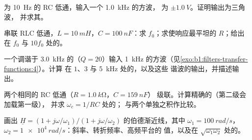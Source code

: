 \begin{exercise}[$\star\star$]\label{exo:b1:filters-transfer-functions:6}
为 \qty{10}{Hz} 的 RC 低通，输入一个 \qty{1.0}{kHz} 的方波，
为 $\pm\qty{1.0}{V}$。证明输出为三角波，
并求其。
\end{exercise}

\begin{exercise}[$\star\star$]\label{exo:b1:filters-transfer-functions:7}
串联 RLC 低通，$L = \qty{10}{mH}$，$C = \qty{100}{nF}$：求
$f_0$；求使响应最平坦的 $R$；给出
在 $f_0$ 与 $10f_0$ 处的。
\end{exercise}

\begin{exercise}[$\star\star$]\label{exo:b1:filters-transfer-functions:8}
一个调谐于 \qty{3.0}{kHz} 的（$Q = 20$）输入
\qty{1}{kHz} 的方波（见\cref{exo:b1:filters-transfer-functions:4}）。计算
在 $1$、$3$ 与 \qty{5}{kHz} 处的，以及这些
谐波的输出，并描述输出。
\end{exercise}

\begin{exercise}[$\star\star$]\label{exo:b1:filters-transfer-functions:9}
两个相同的 RC 低通（$R = \qty{1.0}{k\ohm}$，$C = \qty{159}{nF}$）
级联。计算精确的（第二级会加载第一级），
并求 $\omega_c = 1/RC$ 处的；
与两个单独之积作比较。
\end{exercise}

\begin{exercise}[$\star\star\star$]\label{exo:b1:filters-transfer-functions:10}
画出 $\underline H = (1 + j\omega/\omega_1)/
(1 + j\omega/\omega_2)$ 的伯德渐近线，其中 $\omega_1 = \qty{100}{rad/s}$，$\omega_2 =
\qty{1e4}{rad/s}$：斜率、转折频率、高频平台的
值，以及在 $\sqrt{\omega_1\omega_2}$ 处的。
\end{exercise}

